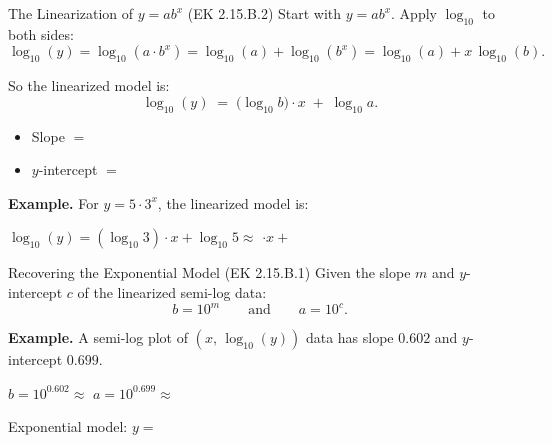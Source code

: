 \documentclass[10pt]{article}
\begin{document}
\vspace{0.08in}

\begin{notesbox}{The Linearization of $y = ab^x$ (EK 2.15.B.2)}
Start with $y = ab^x$.  Apply $\log_{10}$ to both sides:
\[
  \log_{10}(y) = \log_{10}(a \cdot b^x) = \log_{10}(a) + \log_{10}(b^x) = \log_{10}(a) + x\,\log_{10}(b).
\]

So the linearized model is:
\[
  \log_{10}(y) \;=\; \bigl(\log_{10} b\bigr)\cdot x \;+\; \log_{10} a.
\]
\begin{itemize}[leftmargin=1.5em,itemsep=4pt,topsep=4pt]
  \item Slope $=$ \blank{3.5cm}
  \item $y$-intercept $=$ \blank{3.5cm}
\end{itemize}

\vspace{6pt}
\textbf{Example.} For $y = 5 \cdot 3^x$, the linearized model is:

\vspace{4pt}
$\log_{10}(y) = (\log_{10} 3)\cdot x + \log_{10} 5 \approx $ \blank{1.5cm}$\cdot x + $ \blank{1.5cm}
\end{notesbox}

\vspace{0.08in}

\begin{notesbox}{Recovering the Exponential Model (EK 2.15.B.1)}
Given the slope $m$ and $y$-intercept $c$ of the linearized semi-log data:
\[
  b = 10^m \qquad \text{and} \qquad a = 10^c.
\]

\textbf{Example.}  A semi-log plot of $(x,\,\log_{10}(y))$ data has slope $0.602$ and
$y$-intercept $0.699$.

\vspace{4pt}
$b = 10^{0.602} \approx $ \blank{1.5cm} \qquad $a = 10^{0.699} \approx $ \blank{1.5cm}

\vspace{4pt}
Exponential model: $y = $ \blank{4cm}
\end{notesbox}
\end{document}
